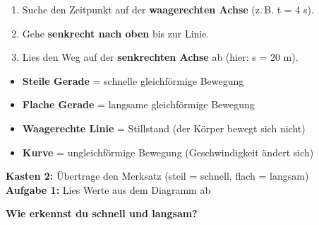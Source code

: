 \documentclass[11pt,a4paper]{article}
\begin{document}
\vspace{0.3em}
\begin{enumerate}[leftmargin=*, itemsep=2pt]
    \item Suche den Zeitpunkt auf der \textbf{waagerechten Achse} (z.\,B. t = 4 s).
    \item Gehe \textbf{senkrecht nach oben} bis zur Linie.
    \item Lies den Weg auf der \textbf{senkrechten Achse} ab (hier: s = 20 m).
\end{enumerate}

\vspace{1em}

\begin{merksatz}
\begin{itemize}[leftmargin=*, itemsep=4pt]
    \item \textbf{Steile Gerade} = schnelle gleichförmige Bewegung
    \item \textbf{Flache Gerade} = langsame gleichförmige Bewegung
    \item \textbf{Waagerechte Linie} = Stillstand (der Körper bewegt sich nicht)
    \item \textbf{Kurve} = ungleichförmige Bewegung (Geschwindigkeit ändert sich)
\end{itemize}
\end{merksatz}

\vspace{0.5em}
\begin{hefterhinweis}
\textbf{Kasten 2:} Übertrage den Merksatz (steil = schnell, flach = langsam)\\
\textbf{Aufgabe 1:} Lies Werte aus dem Diagramm ab
\end{hefterhinweis}

\vspace{0.6em}

\textbf{\textcolor{physik}{Wie erkennst du schnell und langsam?}}
\end{document}
